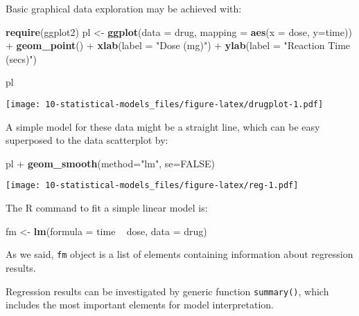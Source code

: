 \documentclass[]{book}
\newenvironment{Shaded}{\begin{snugshade}}{\end{snugshade}}
\newcommand{\KeywordTok}[1]{\textcolor[rgb]{0.13,0.29,0.53}{\textbf{{#1}}}}
\newcommand{\DataTypeTok}[1]{\textcolor[rgb]{0.13,0.29,0.53}{{#1}}}
\newcommand{\StringTok}[1]{\textcolor[rgb]{0.31,0.60,0.02}{{#1}}}
\newcommand{\OtherTok}[1]{\textcolor[rgb]{0.56,0.35,0.01}{{#1}}}
\newcommand{\NormalTok}[1]{{#1}}
\begin{document}
Basic graphical data exploration may be achieved with:

\begin{Shaded}
\begin{Highlighting}[]
\KeywordTok{require}\NormalTok{(ggplot2)}
\NormalTok{pl <-}\StringTok{ }\KeywordTok{ggplot}\NormalTok{(}\DataTypeTok{data =} \NormalTok{drug, }\DataTypeTok{mapping =} \KeywordTok{aes}\NormalTok{(}\DataTypeTok{x =} \NormalTok{dose, }\DataTypeTok{y=}\NormalTok{time)) +}\StringTok{ }
\StringTok{  }\KeywordTok{geom_point}\NormalTok{() +}
\StringTok{  }\KeywordTok{xlab}\NormalTok{(}\DataTypeTok{label =} \StringTok{"Dose (mg)"}\NormalTok{) +}
\StringTok{  }\KeywordTok{ylab}\NormalTok{(}\DataTypeTok{label =} \StringTok{"Reaction Time (secs)"}\NormalTok{)}

\NormalTok{pl}
\end{Highlighting}
\end{Shaded}

\texttt{[image: 10-statistical-models\_files/figure-latex/drugplot-1.pdf]}

A simple model for these data might be a straight line, which can be
easy superposed to the data scatterplot by:

\begin{Shaded}
\begin{Highlighting}[]
\NormalTok{pl +}\StringTok{ }\KeywordTok{geom_smooth}\NormalTok{(}\DataTypeTok{method=}\StringTok{"lm"}\NormalTok{, }\DataTypeTok{se=}\OtherTok{FALSE}\NormalTok{) }
\end{Highlighting}
\end{Shaded}

\texttt{[image: 10-statistical-models\_files/figure-latex/reg-1.pdf]}

The R command to fit a simple linear model is:

\begin{Shaded}
\begin{Highlighting}[]
\NormalTok{fm <-}\StringTok{ }\KeywordTok{lm}\NormalTok{(}\DataTypeTok{formula =} \NormalTok{time ~}\StringTok{ }\NormalTok{dose, }\DataTypeTok{data =} \NormalTok{drug)}
\end{Highlighting}
\end{Shaded}

As we said, \texttt{fm} object is a list of elements containing
information about regression results.

Regression results can be investigated by generic function
\texttt{summary()}, which includes the most important elements for model
interpretation.
\end{document}
